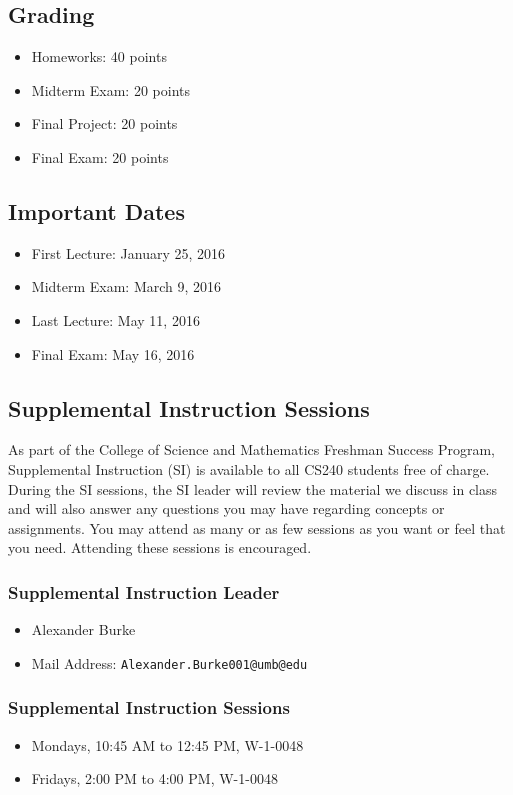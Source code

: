 \documentclass[12pt,letterpaper,twoside]{article}
\begin{document}
\subsection*{Grading}
\begin{itemize}
\item[] Homeworks: 40 points
\item[] Midterm Exam: 20 points
\item[] Final Project: 20 points
\item[] Final Exam: 20 points
\end{itemize}

\subsection*{Important Dates}
\begin{itemize}
\item[] First Lecture: January 25, 2016
\item[] Midterm Exam: March 9, 2016
\item[] Last Lecture: May 11, 2016
\item[] Final Exam: May 16, 2016
\end{itemize}

\subsection*{Supplemental Instruction Sessions}
As part of the College of Science and Mathematics Freshman Success Program, Supplemental Instruction (SI) is available to all CS240 students free of charge.
During the SI sessions, the SI leader will review the material we discuss in class and will also answer any questions you may have regarding concepts or assignments.
You may attend as many or as few sessions as you want or feel that you need. Attending these sessions is encouraged.

\subsubsection*{Supplemental Instruction Leader}
\begin{itemize}
\item[] Alexander Burke
\item[] Mail Address: \texttt{Alexander.Burke001@umb@edu}
\end{itemize}

\subsubsection*{Supplemental Instruction Sessions}
\begin{itemize}
\item[] Mondays, 10:45 AM to 12:45 PM, W-1-0048
\item[] Fridays, 2:00 PM to 4:00 PM, W-1-0048
\end{itemize}
\end{document}
